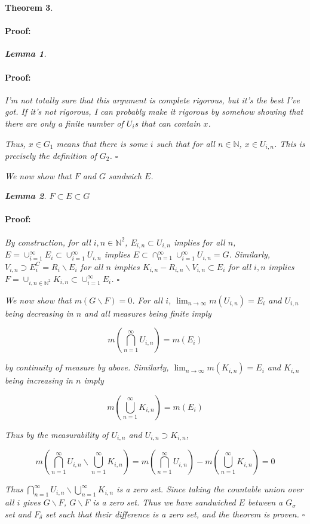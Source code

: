 \documentclass{article}
\newenvironment{proof}{\paragraph{Proof:}}{\hfill$\square$}
\newtheorem{theorem}{Theorem}
\newtheorem{lemma}[theorem]{Lemma}
\newcommand{\N}{\mathbb{N}}
\begin{document}
\begin{theorem}
\begin{proof}
\begin{lemma}
\begin{proof}
I'm not totally sure that this argument is complete rigorous, but it's the best I've got. If it's not rigorous, I can probably make it rigorous by somehow showing that there are only a finite number of $U_i$s that can contain $x$.

Thus, $x \in G_1$ means that there is some $i$ such that for all $n \in \N$, $x \in U_{i, n}$. This is precisely the definition of $G_2$.
\end{proof}
\end{lemma}

We now show that $F$ and $G$ sandwich $E$.

\begin{lemma}
$F \subset E \subset G$
\begin{proof}
By construction, for all $i, n \in \N^2$, $E_{i, n} \subset U_{i, n}$ implies for all $n$, $E = \cup_{i=1}^\infty E_{i} \subset \cup_{i=1}^\infty U_{i, n}$ implies $E \subset \cap_{n=1}^\infty \cup_{i=1}^\infty U_{i, n} = G$. Similarly, $V_{i, n} \supset E_i^C = R_i \backslash E_i$ for all $n$ implies $K_{i, n} - R_{i, n} \backslash V_{i, n} \subset E_i$ for all $i, n$ implies $F = \cup_{i,n \in \N^2} K_{i, n} \subset \cup_{i=1}^\infty E_i$.
\end{proof}
\end{lemma}

We now show that $m(G \backslash F) = 0$. For all $i$, $\lim_{n \rightarrow \infty} m(U_{i, n}) = E_i$ and $U_{i, n}$ being decreasing in $n$ and all measures being finite imply

\[
m(\bigcap_{n=1}^\infty U_{i, n}) = m(E_i)
\]

by continuity of measure by above. Similarly, $\lim_{n \rightarrow \infty} m(K_{i, n}) = E_i$ and $K_{i, n}$ being increasing in $n$ imply

\[
m(\bigcup_{n=1}^\infty K_{i, n}) = m(E_i)
\]

Thus by the measurability of $U_{i, n}$ and $U_{i, n} \supset K_{i, n}$,

\[
m(\bigcap_{n=1}^\infty U_{i, n} \backslash \bigcup_{n=1}^\infty K_{i, n})
= m(\bigcap_{n=1}^\infty U_{i, n}) - m(\bigcup_{n=1}^\infty K_{i, n}) = 0
\]

Thus $\bigcap_{n=1}^\infty U_{i, n} \backslash \bigcup_{n=1}^\infty K_{i, n}$ is a zero set. Since taking the countable union over all $i$ gives $G \backslash F$, $G \backslash F$ is a zero set. Thus we have sandwiched $E$ between a $G_\sigma$ set and $F_\delta$ set such that their difference is a zero set, and the theorem is proven.
\end{proof}
\end{theorem}
\end{document}
